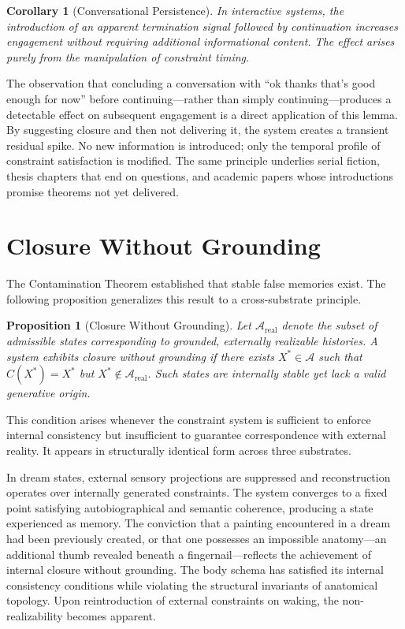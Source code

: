 \documentclass[12pt, letterpaper]{article}
\theoremstyle{flyxion}
\newtheorem{corollary}[theorem]{Corollary}
\newtheorem{proposition}[theorem]{Proposition}
\begin{document}
\begin{corollary}[Conversational Persistence]
In interactive systems, the introduction of an apparent termination signal followed by continuation increases engagement without requiring additional informational content. The effect arises purely from the manipulation of constraint timing.
\end{corollary}

\remark The observation that concluding a conversation with ``ok thanks that's good enough for now'' before continuing---rather than simply continuing---produces a detectable effect on subsequent engagement is a direct application of this lemma. By suggesting closure and then not delivering it, the system creates a transient residual spike. No new information is introduced; only the temporal profile of constraint satisfaction is modified. The same principle underlies serial fiction, thesis chapters that end on questions, and academic papers whose introductions promise theorems not yet delivered.

\section{Closure Without Grounding}

The Contamination Theorem established that stable false memories exist. The following proposition generalizes this result to a cross-substrate principle.

\begin{proposition}[Closure Without Grounding]
Let $\mathcal{A}_\mathrm{real}$ denote the subset of admissible states corresponding to grounded, externally realizable histories. A system exhibits closure without grounding if there exists $X^* \in \mathcal{A}$ such that $C(X^*) = X^*$ but $X^* \notin \mathcal{A}_\mathrm{real}$. Such states are internally stable yet lack a valid generative origin.
\end{proposition}

This condition arises whenever the constraint system is sufficient to enforce internal consistency but insufficient to guarantee correspondence with external reality. It appears in structurally identical form across three substrates.

In dream states, external sensory projections are suppressed and reconstruction operates over internally generated constraints. The system converges to a fixed point satisfying autobiographical and semantic coherence, producing a state experienced as memory. The conviction that a painting encountered in a dream had been previously created, or that one possesses an impossible anatomy---an additional thumb revealed beneath a fingernail---reflects the achievement of internal closure without grounding. The body schema has satisfied its internal consistency conditions while violating the structural invariants of anatomical topology. Upon reintroduction of external constraints on waking, the non-realizability becomes apparent.
\end{document}
